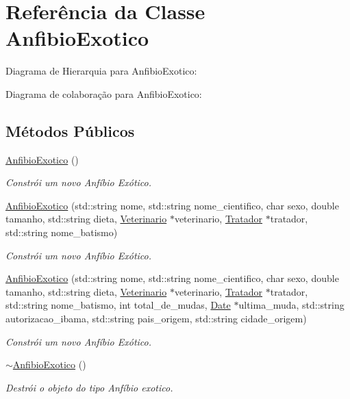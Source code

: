 \hypertarget{classAnfibioExotico}{}\section{Referência da Classe Anfibio\+Exotico}
\label{classAnfibioExotico}


Diagrama de Hierarquia para Anfibio\+Exotico\+:


Diagrama de colaboração para Anfibio\+Exotico\+:
\subsection*{Métodos Públicos}
\begin{DoxyCompactItemize}
\item 
\mbox{\label{classAnfibioExotico_a6f62d4cbdc244038c3b108a7fbfb818d}} 
\hyperlink{classAnfibioExotico_a6f62d4cbdc244038c3b108a7fbfb818d}{Anfibio\+Exotico} ()
\begin{DoxyCompactList}\small\item\em Constrói um novo Anfíbio Exótico. \end{DoxyCompactList}\item 
\hyperlink{classAnfibioExotico_a9c6535c2c202776c0837e4b917589dd6}{Anfibio\+Exotico} (std\+::string nome, std\+::string nome\+\_\+cientifico, char sexo, double tamanho, std\+::string dieta, \hyperlink{classVeterinario}{Veterinario} $\ast$veterinario, \hyperlink{classTratador}{Tratador} $\ast$tratador, std\+::string nome\+\_\+batismo)
\begin{DoxyCompactList}\small\item\em Constrói um novo Anfíbio Exótico. \end{DoxyCompactList}\item 
\hyperlink{classAnfibioExotico_af2c161ad2a2c768aa2636a8f4dfdd707}{Anfibio\+Exotico} (std\+::string nome, std\+::string nome\+\_\+cientifico, char sexo, double tamanho, std\+::string dieta, \hyperlink{classVeterinario}{Veterinario} $\ast$veterinario, \hyperlink{classTratador}{Tratador} $\ast$tratador, std\+::string nome\+\_\+batismo, int total\+\_\+de\+\_\+mudas, \hyperlink{classDate}{Date} $\ast$ultima\+\_\+muda, std\+::string autorizacao\+\_\+ibama, std\+::string pais\+\_\+origem, std\+::string cidade\+\_\+origem)
\begin{DoxyCompactList}\small\item\em Constrói um novo Anfíbio Exótico. \end{DoxyCompactList}\item 
\mbox{\label{classAnfibioExotico_a2615151a98a1713a0d8c65d97bccd813}} 
\hyperlink{classAnfibioExotico_a2615151a98a1713a0d8c65d97bccd813}{$\sim$\+Anfibio\+Exotico} ()
\begin{DoxyCompactList}\small\item\em Destrói o objeto do tipo Anfíbio exotico. \end{DoxyCompactList}\end{DoxyCompactItemize}
